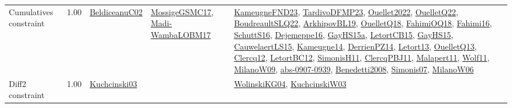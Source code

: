 {\begin{longtable}{p{3cm}r>{\raggedright\arraybackslash}p{6cm}>{\raggedright\arraybackslash}p{6cm}>{\raggedright\arraybackslash}p{8cm}}
\index{Cumulatives constraint}\index{Constraints!Cumulatives constraint}Cumulatives constraint &  1.00 & \hyperref[detail:BeldiceanuC02]{BeldiceanuC02} & \hyperref[detail:MossigeGSMC17]{MossigeGSMC17}, \hyperref[detail:Madi-WambaLOBM17]{Madi-WambaLOBM17} & \hyperref[detail:KameugneFND23]{KameugneFND23}, \hyperref[detail:TardivoDFMP23]{TardivoDFMP23}, \hyperref[detail:Ouellet2022]{Ouellet2022}, \hyperref[detail:OuelletQ22]{OuelletQ22}, \hyperref[detail:BoudreaultSLQ22]{BoudreaultSLQ22}, \hyperref[detail:ArkhipovBL19]{ArkhipovBL19}, \hyperref[detail:OuelletQ18]{OuelletQ18}, \hyperref[detail:FahimiOQ18]{FahimiOQ18}, \hyperref[detail:Fahimi16]{Fahimi16}, \hyperref[detail:SchuttS16]{SchuttS16}, \hyperref[detail:Dejemeppe16]{Dejemeppe16}, \hyperref[detail:GayHS15a]{GayHS15a}, \hyperref[detail:LetortCB15]{LetortCB15}, \hyperref[detail:GayHS15]{GayHS15}, \hyperref[detail:CauwelaertLS15]{CauwelaertLS15}, \hyperref[detail:Kameugne14]{Kameugne14}, \hyperref[detail:DerrienPZ14]{DerrienPZ14}, \hyperref[detail:Letort13]{Letort13}, \hyperref[detail:OuelletQ13]{OuelletQ13}, \hyperref[detail:Clercq12]{Clercq12}, \hyperref[detail:LetortBC12]{LetortBC12}, \hyperref[detail:SimonisH11]{SimonisH11}, \hyperref[detail:ClercqPBJ11]{ClercqPBJ11}, \hyperref[detail:Malapert11]{Malapert11}, \hyperref[detail:Wolf11]{Wolf11}, \hyperref[detail:MilanoW09]{MilanoW09}, \hyperref[detail:abs-0907-0939]{abs-0907-0939}, \hyperref[detail:Benedetti2008]{Benedetti2008}, \hyperref[detail:Simonis07]{Simonis07}, \hyperref[detail:MilanoW06]{MilanoW06}\\
\index{Diff2 constraint}\index{Constraints!Diff2 constraint}Diff2 constraint &  1.00 & \hyperref[detail:Kuchcinski03]{Kuchcinski03} &  & \hyperref[detail:WolinskiKG04]{WolinskiKG04}, \hyperref[detail:KuchcinskiW03]{KuchcinskiW03}\\

\end{longtable}}
